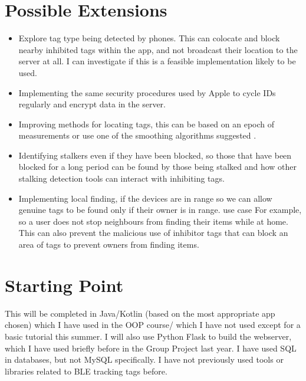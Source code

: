 \documentclass{article}
\begin{document}
\section{Possible Extensions}
\begin{itemize}


\item{Explore tag type being detected by phones. This can colocate and block nearby inhibited tags within the app, and not broadcast their location to the server at all.  I can investigate if this is a feasible implementation likely to be used.}


\item{Implementing the same security procedures used by Apple to cycle IDs regularly and encrypt data in the server.
}


\item{Improving methods for locating tags, this can be based on an epoch of measurements\cite{FingerprintingBLE} or use one of the smoothing algorithms suggested \cite{Smooth}. }


\item{Identifying stalkers even if they have been blocked, so those that have been blocked for a long period can be found by those being stalked and how other stalking detection tools can interact with inhibiting tags.}


\item{Implementing local finding, if the devices are in range so we can allow genuine tags to be found only if their owner is in range. use case For example, so a user does not stop neighbours from finding their items while at home. This can also prevent the malicious use of inhibitor tags that can block an area of tags to prevent owners from finding items.}
\end{itemize}




\section{Starting Point}


This will be completed in Java/Kotlin (based on the most appropriate app chosen) which I have used in the OOP course/ which I have not used except for a basic tutorial this summer.
I will also use Python Flask to build the webserver, which I have used briefly before in the Group Project last year. I have used SQL in databases, but not MySQL specifically. I have not previously used tools or libraries related to BLE tracking tags before.
\end{document}
